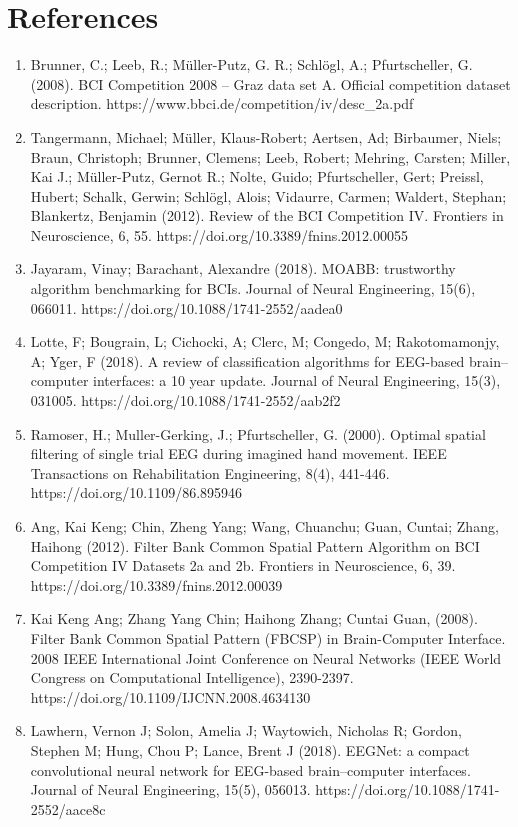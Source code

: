 \documentclass[11pt]{article}
\begin{document}
\section*{References}
\begin{enumerate}
\item Brunner, C.; Leeb, R.; Müller-Putz, G. R.; Schlögl, A.; Pfurtscheller, G. (2008). BCI Competition 2008 -- Graz data set A. Official competition dataset description. https://www.bbci.de/competition/iv/desc\_2a.pdf
\item Tangermann, Michael; Müller, Klaus-Robert; Aertsen, Ad; Birbaumer, Niels; Braun, Christoph; Brunner, Clemens; Leeb, Robert; Mehring, Carsten; Miller, Kai J.; Müller-Putz, Gernot R.; Nolte, Guido; Pfurtscheller, Gert; Preissl, Hubert; Schalk, Gerwin; Schlögl, Alois; Vidaurre, Carmen; Waldert, Stephan; Blankertz, Benjamin (2012). Review of the BCI Competition IV. Frontiers in Neuroscience, 6, 55. https://doi.org/10.3389/fnins.2012.00055
\item Jayaram, Vinay; Barachant, Alexandre (2018). MOABB: trustworthy algorithm benchmarking for BCIs. Journal of Neural Engineering, 15(6), 066011. https://doi.org/10.1088/1741-2552/aadea0
\item Lotte, F; Bougrain, L; Cichocki, A; Clerc, M; Congedo, M; Rakotomamonjy, A; Yger, F (2018). A review of classification algorithms for EEG-based brain--computer interfaces: a 10 year update. Journal of Neural Engineering, 15(3), 031005. https://doi.org/10.1088/1741-2552/aab2f2
\item Ramoser, H.; Muller-Gerking, J.; Pfurtscheller, G. (2000). Optimal spatial filtering of single trial EEG during imagined hand movement. IEEE Transactions on Rehabilitation Engineering, 8(4), 441-446. https://doi.org/10.1109/86.895946
\item Ang, Kai Keng; Chin, Zheng Yang; Wang, Chuanchu; Guan, Cuntai; Zhang, Haihong (2012). Filter Bank Common Spatial Pattern Algorithm on BCI Competition IV Datasets 2a and 2b. Frontiers in Neuroscience, 6, 39. https://doi.org/10.3389/fnins.2012.00039
\item Kai Keng Ang; Zhang Yang Chin; Haihong Zhang; Cuntai Guan,  (2008). Filter Bank Common Spatial Pattern (FBCSP) in Brain-Computer Interface. 2008 IEEE International Joint Conference on Neural Networks (IEEE World Congress on Computational Intelligence), 2390-2397. https://doi.org/10.1109/IJCNN.2008.4634130
\item Lawhern, Vernon J; Solon, Amelia J; Waytowich, Nicholas R; Gordon, Stephen M; Hung, Chou P; Lance, Brent J (2018). EEGNet: a compact convolutional neural network for EEG-based brain--computer interfaces. Journal of Neural Engineering, 15(5), 056013. https://doi.org/10.1088/1741-2552/aace8c

\end{enumerate}
\end{document}

